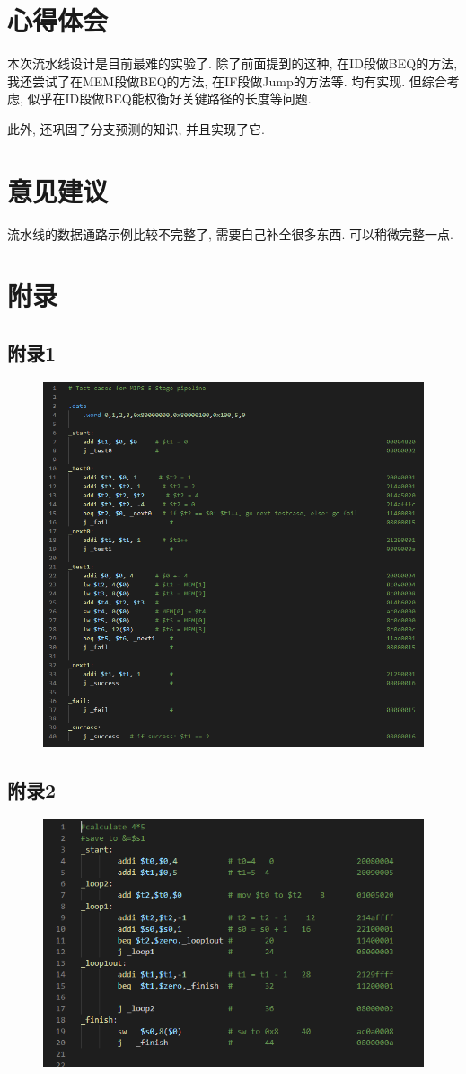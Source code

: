 \documentclass[UTF8]{article}
\begin{document}
\section{心得体会}
本次流水线设计是目前最难的实验了. 除了前面提到的这种, 在ID段做BEQ的方法, 我还尝试了在MEM段做BEQ的方法, 在IF段做Jump的方法等. 均有实现. 但综合考虑, 似乎在ID段做BEQ能权衡好关键路径的长度等问题.\par
此外, 还巩固了分支预测的知识, 并且实现了它.

\section{意见建议}
流水线的数据通路示例比较不完整了, 需要自己补全很多东西. 可以稍微完整一点.

\section{附录}
\subsection{附录1}
\begin{figure}[H]
	\centering
	\includegraphics[width=\linewidth]{asm.png}
	\label{asm}
\end{figure}
\subsection{附录2}
\begin{figure}[H]
	\centering
	\includegraphics[width=\linewidth]{asm_predictor.png}
	\label{asm_predictor}
\end{figure}
\end{document}
